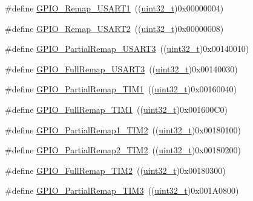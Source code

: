 \begin{DoxyCompactItemize}
\item 
\#define \hyperlink{group___g_p_i_o___remap__define_ga804d946c5ca246a1f02f73a086586fd6}{G\+P\+I\+O\+\_\+\+Remap\+\_\+\+U\+S\+A\+R\+T1}~((\hyperlink{_p_e___types_8h_a33594304e786b158f3fb30289278f5af}{uint32\+\_\+t})0x00000004)
\item 
\#define \hyperlink{group___g_p_i_o___remap__define_gaeb2ebb12e23138509af20dce1fc6c246}{G\+P\+I\+O\+\_\+\+Remap\+\_\+\+U\+S\+A\+R\+T2}~((\hyperlink{_p_e___types_8h_a33594304e786b158f3fb30289278f5af}{uint32\+\_\+t})0x00000008)
\item 
\#define \hyperlink{group___g_p_i_o___remap__define_ga97af4aa8dded530353160cca615ad201}{G\+P\+I\+O\+\_\+\+Partial\+Remap\+\_\+\+U\+S\+A\+R\+T3}~((\hyperlink{_p_e___types_8h_a33594304e786b158f3fb30289278f5af}{uint32\+\_\+t})0x00140010)
\item 
\#define \hyperlink{group___g_p_i_o___remap__define_gaa8831190b5b68e9f871955b791fa358b}{G\+P\+I\+O\+\_\+\+Full\+Remap\+\_\+\+U\+S\+A\+R\+T3}~((\hyperlink{_p_e___types_8h_a33594304e786b158f3fb30289278f5af}{uint32\+\_\+t})0x00140030)
\item 
\#define \hyperlink{group___g_p_i_o___remap__define_ga0e94344776c53a76f6e9d933139c05a6}{G\+P\+I\+O\+\_\+\+Partial\+Remap\+\_\+\+T\+I\+M1}~((\hyperlink{_p_e___types_8h_a33594304e786b158f3fb30289278f5af}{uint32\+\_\+t})0x00160040)
\item 
\#define \hyperlink{group___g_p_i_o___remap__define_gaf1f2d5cbc2281b3e3a6cc51c3fe7f77f}{G\+P\+I\+O\+\_\+\+Full\+Remap\+\_\+\+T\+I\+M1}~((\hyperlink{_p_e___types_8h_a33594304e786b158f3fb30289278f5af}{uint32\+\_\+t})0x001600\+C0)
\item 
\#define \hyperlink{group___g_p_i_o___remap__define_ga7ad69d3e2643b2bfee4eebbea4a5b80e}{G\+P\+I\+O\+\_\+\+Partial\+Remap1\+\_\+\+T\+I\+M2}~((\hyperlink{_p_e___types_8h_a33594304e786b158f3fb30289278f5af}{uint32\+\_\+t})0x00180100)
\item 
\#define \hyperlink{group___g_p_i_o___remap__define_ga42908e73dfc201d0a7b4ab0ed6f15eb7}{G\+P\+I\+O\+\_\+\+Partial\+Remap2\+\_\+\+T\+I\+M2}~((\hyperlink{_p_e___types_8h_a33594304e786b158f3fb30289278f5af}{uint32\+\_\+t})0x00180200)
\item 
\#define \hyperlink{group___g_p_i_o___remap__define_ga2bd999e77236155935d2a598d4bac2a9}{G\+P\+I\+O\+\_\+\+Full\+Remap\+\_\+\+T\+I\+M2}~((\hyperlink{_p_e___types_8h_a33594304e786b158f3fb30289278f5af}{uint32\+\_\+t})0x00180300)
\item 
\#define \hyperlink{group___g_p_i_o___remap__define_gaaced3961a038fd8b41abfaf55d24f609}{G\+P\+I\+O\+\_\+\+Partial\+Remap\+\_\+\+T\+I\+M3}~((\hyperlink{_p_e___types_8h_a33594304e786b158f3fb30289278f5af}{uint32\+\_\+t})0x001\+A0800)

\end{DoxyCompactItemize}
